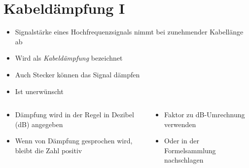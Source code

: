 
\section{Kabeldämpfung I}
\label{section:kabeldaempfung_1}
\begin{frame}%
\begin{itemize}
  \item Signalstärke eines Hochfrequenzsignals nimmt bei zunehmender Kabellänge ab
  \item Wird als \emph{Kabeldämpfung} bezeichnet
  \item Auch Stecker können das Signal dämpfen
  \item Ist unerwünscht
  \end{itemize}
\end{frame}

\begin{frame}
\begin{columns}
    \begin{column}{0.48\textwidth}
    \begin{itemize}
  \item Dämpfung wird in der Regel in Dezibel (dB) angegeben
  \item Wenn von Dämpfung gesprochen wird, bleibt die Zahl positiv
  \end{itemize}

    \end{column}
   \begin{column}{0.48\textwidth}
       \begin{itemize}
  \item Faktor zu dB-Umrechnung verwenden
  \item Oder in der Formelsammlung nachschlagen
  \end{itemize}

   \end{column}
\end{columns}

\end{frame}

\begin{frame}
\end{frame}

